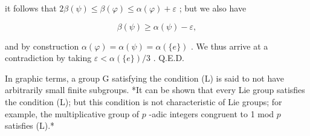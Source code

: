 it follows that \(2\beta (\psi)\leqslant \beta (\varphi)\leqslant \alpha (\varphi) + \varepsilon\) ; but we also have

\[
\beta (\psi) \geqslant \alpha (\psi) - \varepsilon ,
\]

and by construction \(\alpha(\varphi) = \alpha(\psi) = \alpha(\{e\})\) . We thus arrive at a contradiction by taking \(\varepsilon < \alpha(\{e\})/3\) . Q.E.D.

In graphic terms, a group G satisfying the condition (L) is said to not have arbitrarily small finite subgroups. *It can be shown that every Lie group satisfies the condition (L); but this condition is not characteristic of Lie groups; for example, the multiplicative group of \(p\) -adic integers congruent to 1 mod \(p\) satisfies (L).*

